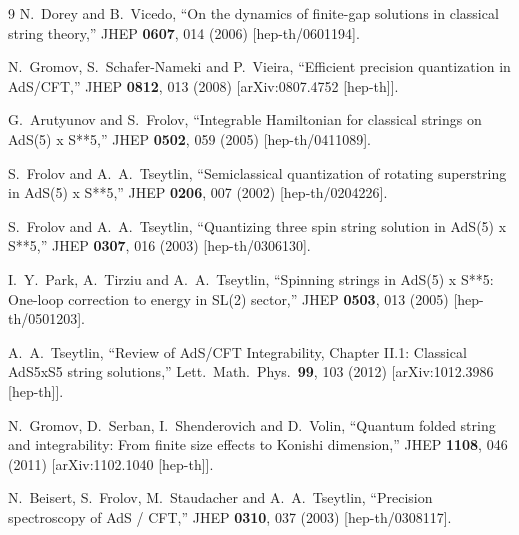 \documentclass[a4paper,11pt]{article}
\numberwithin{equation}{section}
\begin{document}
\begin{thebibliography} {9}
  N.~Dorey and B.~Vicedo,
  ``On the dynamics of finite-gap solutions in classical string theory,''
  JHEP {\bf 0607}, 014 (2006)
  [hep-th/0601194].

  N.~Gromov, S.~Schafer-Nameki and P.~Vieira,
  ``Efficient precision quantization in AdS/CFT,''
  JHEP {\bf 0812}, 013 (2008)
  [arXiv:0807.4752 [hep-th]].

  G.~Arutyunov and S.~Frolov,
  ``Integrable Hamiltonian for classical strings on AdS(5) x S**5,''
  JHEP {\bf 0502}, 059 (2005)
  [hep-th/0411089].

  S.~Frolov and A.~A.~Tseytlin,
  ``Semiclassical quantization of rotating superstring in AdS(5) x S**5,''
  JHEP {\bf 0206}, 007 (2002)
  [hep-th/0204226].

  S.~Frolov and A.~A.~Tseytlin,
  ``Quantizing three spin string solution in AdS(5) x S**5,''
  JHEP {\bf 0307}, 016 (2003)
  [hep-th/0306130].

  I.~Y.~Park, A.~Tirziu and A.~A.~Tseytlin,
  ``Spinning strings in AdS(5) x S**5: One-loop correction to energy in SL(2) sector,''
  JHEP {\bf 0503}, 013 (2005)
  [hep-th/0501203].

  A.~A.~Tseytlin,
  ``Review of AdS/CFT Integrability, Chapter II.1: Classical AdS5xS5 string solutions,''
  Lett.\ Math.\ Phys.\  {\bf 99}, 103 (2012)
  [arXiv:1012.3986 [hep-th]].

  N.~Gromov, D.~Serban, I.~Shenderovich and D.~Volin,
  ``Quantum folded string and integrability: From finite size effects to Konishi dimension,''
  JHEP {\bf 1108}, 046 (2011)
  [arXiv:1102.1040 [hep-th]].

  N.~Beisert, S.~Frolov, M.~Staudacher and A.~A.~Tseytlin,
  ``Precision spectroscopy of AdS / CFT,''
  JHEP {\bf 0310}, 037 (2003)
  [hep-th/0308117].


\end{thebibliography}
\end{document}
